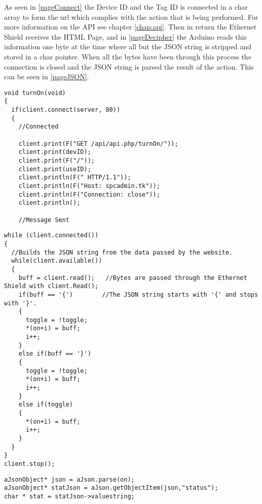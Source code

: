 As seen in \autoref{pageConnect} the Device ID and the Tag ID is connected in a char array to form the url which complies with the action that is being performed. For more information on the API see chapter \vref{chap:api}.
Then in return the Ethernet Shield receives the HTML Page, and in \autoref{pageDecipher} the Arduino reads this information one byte at the time where all but the JSON string is stripped and stored in a char pointer.
When all the bytes have been through this process the connection is closed and the JSON string is parsed the result of the action. This can be seen in \autoref{pageJSON}.
\begin{lstlisting}[frame=single, label=pageConnect, caption=Connecting to the Server and creating an HTML request.]
void turnOn(void)
{
  if(client.connect(server, 80))
  {
    //Connected

    client.print(F("GET /api/api.php/turnOn/"));
    client.print(devID);
    client.print(F("/"));
    client.print(useID);
    client.println(F(" HTTP/1.1"));
    client.println(F("Host: spcadmin.tk"));
    client.println(F("Connection: close"));
    client.println();
    
    //Message Sent
\end{lstlisting}

\begin{lstlisting}[frame=single, label=pageDecipher, caption=Removing all but the important information from the website.]
while (client.connected())
{
  //Builds the JSON string from the data passed by the website.
  while(client.available()) 
  { 
    buff = client.read();   //Bytes are passed through the Ethernet Shield with client.Read();
    if(buff == '{')        //The JSON string starts with '{' and stops with '}'.
    {
      toggle = !toggle;
      *(on+i) = buff;
      i++;
    }
    else if(buff == '}')
    {
      toggle = !toggle;
      *(on+i) = buff;
      i++;
    }
    else if(toggle)
    {
      *(on+i) = buff;
      i++;
    }
  }
}
client.stop();
\end{lstlisting}

\begin{lstlisting}[frame=single, label=pageJSON, caption=The JSON Code Getting a value with a Token.]
aJsonObject* json = aJson.parse(on);
aJsonObject* statJson = aJson.getObjectItem(json,"status");
char * stat = statJson->valuestring;
\end{lstlisting}
